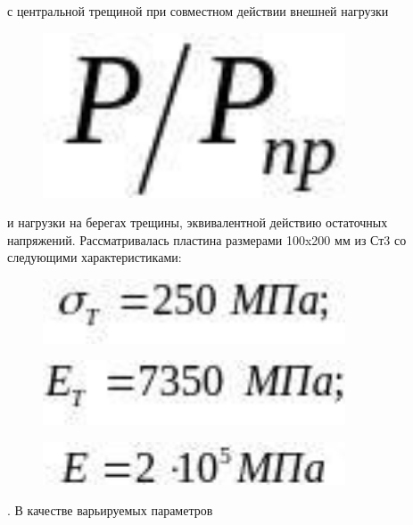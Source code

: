 с центральной трещиной при совместном действии внешней нагрузки
\begin{figure}[H]
	\centering
	\includegraphics[width=0.8\textwidth]{assets/1214}
	\caption*{}
\end{figure}и нагрузки на берегах трещины,
эквивалентной действию остаточных напряжений. Рассматривалась пластина
размерами 100x200 мм из Ст3 со следующими характеристиками:
\begin{figure}[H]
	\centering
	\includegraphics[width=0.8\textwidth]{assets/1215}
	\caption*{}
\end{figure} \begin{figure}[H]
	\centering
	\includegraphics[width=0.8\textwidth]{assets/1216}
	\caption*{}
\end{figure}
\begin{figure}[H]
	\centering
	\includegraphics[width=0.8\textwidth]{assets/1217}
	\caption*{}
\end{figure}. В качестве варьируемых параметров
